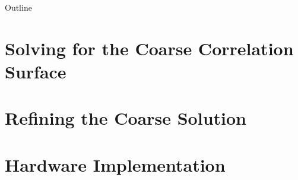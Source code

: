 \documentclass[11pt]{beamer}
\begin{document}
	
	\begin{frame}
		\titlepage
	\end{frame}
	
	\begin{frame}{Outline}
		\tableofcontents
	\end{frame}
	
	
	
	
	
	
	
	
	
	
	\section{Solving for the Coarse Correlation Surface}
	
	\section{Refining the Coarse Solution}
	
	
\section{Hardware Implementation}

	
\end{document}
